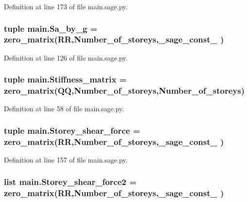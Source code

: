 Definition at line 173 of file main.\+sage.\+py.

\hypertarget{namespacemain_ac3a509169246622b50fc23d809d30833}{}
\subsubsection[{Sa\+\_\+by\+\_\+g}]{\setlength{\rightskip}{0pt plus 5cm}tuple main.\+Sa\+\_\+by\+\_\+g = zero\+\_\+matrix(R\+R,Number\+\_\+of\+\_\+storeys,\+\_\+sage\+\_\+const\+\_ )}\label{namespacemain_ac3a509169246622b50fc23d809d30833}


Definition at line 126 of file main.\+sage.\+py.

\hypertarget{namespacemain_a0011be18dbc87087d6aaf28802f121c0}{}
\subsubsection[{Stiffness\+\_\+matrix}]{\setlength{\rightskip}{0pt plus 5cm}tuple main.\+Stiffness\+\_\+matrix = zero\+\_\+matrix(Q\+Q,Number\+\_\+of\+\_\+storeys,Number\+\_\+of\+\_\+storeys)}\label{namespacemain_a0011be18dbc87087d6aaf28802f121c0}


Definition at line 58 of file main.\+sage.\+py.

\hypertarget{namespacemain_aaa52e7055409dcf0785880422294a704}{}
\subsubsection[{Storey\+\_\+shear\+\_\+force}]{\setlength{\rightskip}{0pt plus 5cm}tuple main.\+Storey\+\_\+shear\+\_\+force = zero\+\_\+matrix(R\+R,Number\+\_\+of\+\_\+storeys,\+\_\+sage\+\_\+const\+\_ )}\label{namespacemain_aaa52e7055409dcf0785880422294a704}


Definition at line 157 of file main.\+sage.\+py.

\hypertarget{namespacemain_ab6dd9cc05fd903a9da8b9734c44fef57}{}
\subsubsection[{Storey\+\_\+shear\+\_\+force2}]{\setlength{\rightskip}{0pt plus 5cm}list main.\+Storey\+\_\+shear\+\_\+force2 = zero\+\_\+matrix(R\+R,Number\+\_\+of\+\_\+storeys,\+\_\+sage\+\_\+const\+\_ )}\label{namespacemain_ab6dd9cc05fd903a9da8b9734c44fef57}


